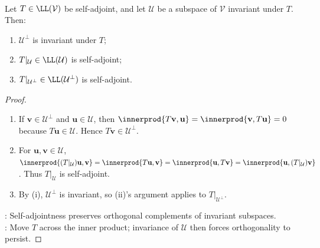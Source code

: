 \begin{proposition} \label{prop:self-adjoint-invariant-subspaces} \\
Let $T\in\LL(\mathcal{V})$ be self-adjoint, and let $\mathcal{U}$ be a subspace of $\mathcal{V}$ invariant under $T$. Then:
\begin{enumerate}[label=\roman*.]
\setlength{\itemsep}{0pt}
\item $\mathcal{U}^{\perp}$ is invariant under $T$;
\item $T|_{\mathcal{U}}\in\LL(\mathcal{U})$ is self-adjoint;
\item $T|_{\mathcal{U}^{\perp}}\in\LL(\mathcal{U}^{\perp})$ is self-adjoint.
\end{enumerate}
\begin{proof}
\begin{enumerate}[label=(\roman*)]
\setlength{\itemsep}{0pt}
\item
If $\mathbf{v}\in\mathcal{U}^{\perp}$ and $\mathbf{u}\in\mathcal{U}$, then $\innerprod{T\mathbf{v},\mathbf{u}}=\innerprod{\mathbf{v},T\mathbf{u}}=0$ because $T\mathbf{u}\in\mathcal{U}$. Hence $T\mathbf{v}\in\mathcal{U}^{\perp}$.
\item For $\mathbf{u},\mathbf{v}\in\mathcal{U}$, $\innerprod{(T|_{\mathcal{U}})\mathbf{u},\mathbf{v}} =\innerprod{T\mathbf{u},\mathbf{v}} =\innerprod{\mathbf{u},T\mathbf{v}} =\innerprod{\mathbf{u},(T|_{\mathcal{U}})\mathbf{v}}$. Thus $T|_{\mathcal{U}}$ is self-adjoint.
\item By (i), $\mathcal{U}^{\perp}$ is invariant, so (ii)'s argument applies to $T|_{\mathcal{U}^{\perp}}$.
\end{enumerate}
: Self-adjointness preserves orthogonal complements of invariant subspaces.\\
: Move $T$ across the inner product; invariance of $\mathcal{U}$ then forces orthogonality to persist.
\end{proof}
\end{proposition}


